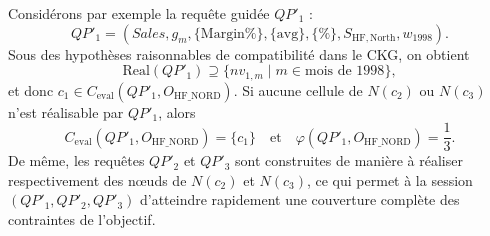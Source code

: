 \documentclass[journal]{IEEEtran}
\begin{document}
Considérons par exemple la requête guidée $QP'_1$ :
\[
QP'_1=(\textit{Sales},g_m,\{\mathrm{Margin\%}\},\{\mathrm{avg}\},\{\%\},S_{\mathrm{HF,North}},w_{1998}).
\]
Sous des hypothèses raisonnables de compatibilité dans le CKG, on obtient
\[
\mathrm{Real}(QP'_1)\supseteq \{nv_{1,m}\mid m\in \text{mois de 1998}\},
\]
et donc $c_1\in C_{\mathrm{eval}}(QP'_1,O_{\mathrm{HF\_NORD}})$. Si aucune cellule de $N(c_2)$ ou $N(c_3)$ n'est réalisable par $QP'_1$, alors
\[
C_{\mathrm{eval}}(QP'_1,O_{\mathrm{HF\_NORD}})=\{c_1\}
\quad\text{et}\quad
\varphi(QP'_1,O_{\mathrm{HF\_NORD}})=\frac{1}{3}.
\]
De même, les requêtes $QP'_2$ et $QP'_3$ sont construites de manière à réaliser respectivement des nœuds de $N(c_2)$ et $N(c_3)$, ce qui permet à la session $(QP'_1,QP'_2,QP'_3)$ d'atteindre rapidement une couverture complète des contraintes de l'objectif.
\end{document}
